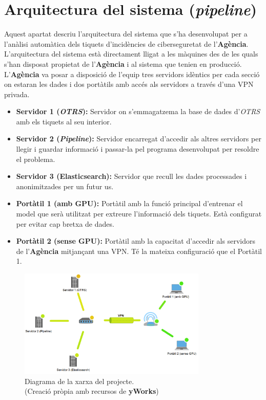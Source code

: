 \section{Arquitectura del sistema (\textit{pipeline})}
Aquest apartat descriu l'arquitectura del sistema que s'ha desenvolupat per a l'anàlisi automàtica dels tiquets d'incidències de ciberseguretat de l'\textbf{Agència}. L'arquitectura del sistema està directament lligat a les màquines des de les quals s'han disposat propietat de l'\textbf{Agència} i al sistema que tenien en producció. L'\textbf{Agència} va posar a disposició de l'equip tres servidors idèntics per cada secció on estaran les dades i dos portàtils amb accés als servidors a través d'una VPN privada.

\begin{itemize}
     \item \textbf{Servidor 1 (\textit{OTRS}):} Servidor on s'emmagatzema la base de dades d'\textit{OTRS} amb els tiquets al seu interior.
     \item \textbf{Servidor 2 (\textit{Pipeline}):} Servidor encarregat d'accedir als altres servidors per llegir i guardar informació i passar-la pel programa desenvolupat per resoldre el problema.
     \item \textbf{Servidor 3 (Elasticsearch):} Servidor que recull les dades processades i anonimitzades per un futur us.
\end{itemize}

\begin{itemize}
     \item \textbf{Portàtil 1 (amb GPU):} Portàtil amb la funció principal d'entrenar el model que serà utilitzat per extreure l'informació dels tiquets. Està configurat per evitar cap bretxa de dades.
     \item \textbf{Portàtil 2 (sense GPU):} Portàtil amb la capacitat d'accedir als servidors de l'\textbf{Agència} mitjançant una VPN. Té la mateixa configuració que el Portàtil 1.
\end{itemize}

\begin{figure}[H]
     \centering
     \includegraphics[width=0.8\textwidth]{network.png}
     \caption[Diagrama de la xarxa del projecte]{Diagrama de la xarxa del projecte. \\ (Creació pròpia amb recursos de \textbf{yWorks})}
     \label{fig:network}
\end{figure}

